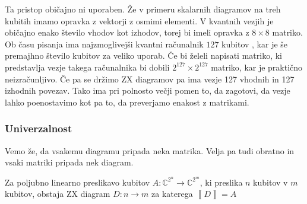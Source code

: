 \documentclass[mat1]{fmfdelo}
\newcommand{\C}{\mathbb C}
\newcommand{\interpret}[1]{\left\llbracket #1 \right\rrbracket}
\begin{document}
Ta pristop običajno ni uporaben. Že v primeru skalarnih diagramov na treh kubitih imamo opravka z vektorji z osmimi elementi. V kvantnih vezjih je običajno enako število vhodov kot izhodov, torej bi imeli opravka z \(8\times8\) matriko. Ob času pisanja ima najzmoglivejši kvantni računalnik \(127\) kubitov \cite{hugh}, kar je še premajhno število kubitov za veliko uporab. Če bi želeli napisati matriko, ki predstavlja vezje takega računalnika bi dobili \(2^{127}\times 2^{127}\) matriko, kar je praktično neizračunljivo. Če pa se držimo ZX diagramov pa ima vezje 127 vhodnih in 127 izhodnih povezav. Tako ima pri polnosto večji pomen to, da zagotovi, da vezje lahko poenostavimo kot pa to, da preverjamo enakost z matrikami.
\subsubsection{Univerzalnost}
Vemo že, da vsakemu diagramu pripada neka matrika. Velja pa tudi obratno in vsaki matriki pripada nek diagram.
\begin{izrek}[Univerzalnost]
    Za poljubno linearno preslikavo kubitov \(A:\C^{2^n}\to \C^{2^m}\), ki preslika \(n\) kubitov v \(m\) kubitov, obstaja ZX diagram \(D:n\to m\) za katerega \(\interpret{D}=A\)
\end{izrek}
\end{document}
